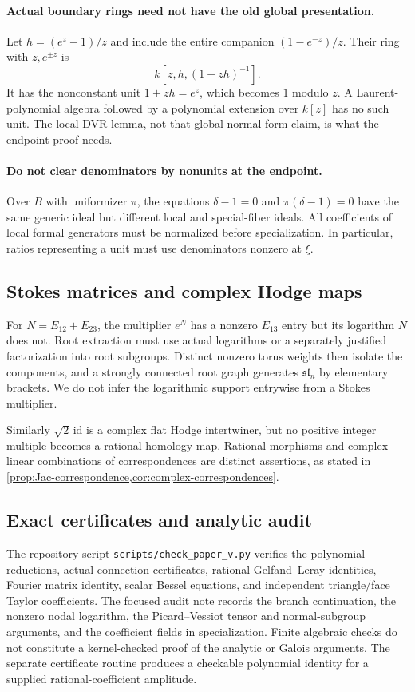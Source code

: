 \documentclass[11pt]{article}
\numberwithin{equation}{section}
\theoremstyle{definition}
\theoremstyle{remark}
\begin{document}
\paragraph{Actual boundary rings need not have the old global presentation.}
Let $h=(e^z-1)/z$ and include the entire companion $(1-e^{-z})/z$.
Their ring with $z,e^{\pm z}$ is
\[
 k[z,h,(1+zh)^{-1}].
\]
It has the nonconstant unit $1+zh=e^z$, which becomes $1$ modulo $z$.
A Laurent-polynomial algebra followed by a polynomial extension over $k[z]$
has no such unit. The local DVR lemma, not that global normal-form claim,
is what the endpoint proof needs.

\paragraph{Do not clear denominators by nonunits at the endpoint.}
Over $B$ with uniformizer $\pi$, the equations
$\delta-1=0$ and $\pi(\delta-1)=0$ have the same generic ideal but
different local and special-fiber ideals. All coefficients of local
formal generators must be normalized before specialization. In particular,
ratios representing a unit must use denominators nonzero at $\xi$.

\subsection{Stokes matrices and complex Hodge maps}
For $N=E_{12}+E_{23}$, the multiplier $e^N$ has a nonzero $E_{13}$ entry
but its logarithm $N$ does not. Root extraction must use actual logarithms
or a separately justified factorization into root subgroups. Distinct
nonzero torus weights then isolate the components, and a strongly connected
root graph generates $\mathfrak{sl}_n$ by elementary brackets. We do not
infer the logarithmic support entrywise from a Stokes multiplier.

Similarly $\sqrt2\,\mathrm{id}$ is a complex flat Hodge intertwiner, but
no positive integer multiple becomes a rational homology map. Rational
morphisms and complex linear combinations of correspondences are distinct
assertions, as stated in \cref{prop:Jac-correspondence,cor:complex-correspondences}.

\subsection{Exact certificates and analytic audit}
The repository script \texttt{scripts/check\_paper\_v.py} verifies the
polynomial reductions, actual connection certificates, rational
Gelfand--Leray identities, Fourier matrix identity, scalar Bessel equations,
and independent triangle/face Taylor coefficients. The focused audit note
records the branch continuation, the nonzero nodal logarithm, the
Picard--Vessiot tensor and normal-subgroup arguments, and the coefficient
fields in specialization. Finite algebraic checks do not constitute a
kernel-checked proof of the analytic or Galois arguments. The separate
certificate routine produces a checkable polynomial identity for a supplied
rational-coefficient amplitude.
\end{document}
